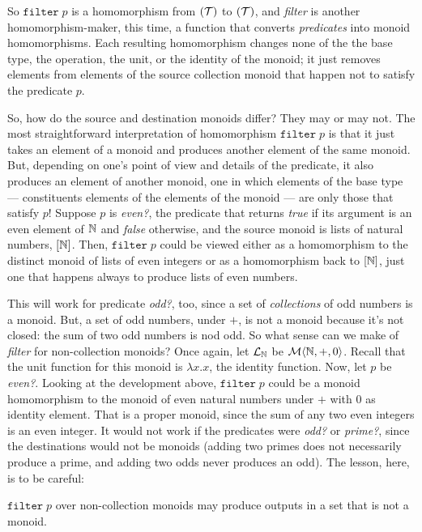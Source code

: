 So $\mathtt{filter}\;p$ is a homomorphism from $(\mathcal{T})$ to $(\mathcal{T})$, and \emph{filter} is another homomorphism-maker, this time, a function that converts \emph{predicates} into monoid homomorphisms. Each resulting homomorphism changes none of the the base type, the operation, the unit, or the identity of the monoid; it just removes elements from elements of the source collection monoid that happen not to satisfy the predicate $p$. 


So, how do the source and destination monoids differ? They may or may not. The most straightforward interpretation of homomorphism $\mathtt{filter}\;p$ is that it just takes an element of a monoid and produces another element of the same monoid. But, depending on one's point of view and details of the predicate, it also produces an element of another monoid, one in which elements of the base type --- constituents elements of the elements of the monoid --- are only those that satisfy $p$! Suppose $p$ is \emph{even?}, the predicate that returns \emph{true} if its argument is an even element of $\mathbb{N}$ and \emph{false} otherwise, and the source monoid is lists of natural numbers, $[\mathbb{N}]$. Then, $\mathtt{filter}\;p$ could be viewed either as a homomorphism to the distinct monoid of lists of even integers or as a homomorphism back to $[\mathbb{N}]$, just one that happens always to produce lists of even numbers. 


This will work for predicate \emph{odd?}, too, since a set of \emph{collections} of odd numbers is a monoid. But, a set of odd numbers, under $+$, is not a monoid because it's not closed: the sum of two odd numbers is nod odd. So what sense can we make of \emph{filter} for non-collection monoids? Once again, let $\mathcal{L}_{\mathbb{N}}$ be $\mathcal{M}\langle{\mathbb{N}},{+},{0}\rangle$. Recall that the unit function for this monoid is $\lambda x.x$, the identity function. Now, let $p$ be \emph{even?}. Looking at the development above, $\mathtt{filter}\;p$ could be a monoid homomorphism to the monoid of even natural numbers under $+$ with $0$ as identity element. That is a proper monoid, since the sum of any two even integers is an even integer. It would not work if the predicates were \emph{odd?} or \emph{prime?}, since the destinations would not be monoids (adding two primes does not necessarily produce a prime, and adding two odds never produces an odd). The lesson, here, is to be careful:


\begin{observation}
  $\mathtt{filter}\;p$ over non-collection monoids may produce outputs in a set that is not a monoid. 
\end{observation}


